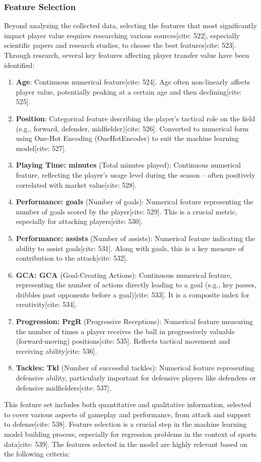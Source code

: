\documentclass[12pt]{report}
\begin{document}
{{{\subsubsection{Feature Selection}
Beyond analyzing the collected data, selecting the features that most significantly impact player value requires researching various sources[cite: 522], especially scientific papers and research studies, to choose the best features[cite: 523]. Through research, several key features affecting player transfer value have been identified:
\begin{enumerate}
    \item \textbf{Age}: Continuous numerical feature[cite: 524]. Age often non-linearly affects player value, potentially peaking at a certain age and then declining[cite: 525].
    \item \textbf{Position}: Categorical feature describing the player's tactical role on the field (e.g., forward, defender, midfielder)[cite: 526]. Converted to numerical form using One-Hot Encoding (OneHotEncoder) to suit the machine learning model[cite: 527].
    \item \textbf{Playing Time: minutes} (Total minutes played): Continuous numerical feature, reflecting the player's usage level during the season – often positively correlated with market value[cite: 528].
    \item \textbf{Performance: goals} (Number of goals): Numerical feature representing the number of goals scored by the player[cite: 529]. This is a crucial metric, especially for attacking players[cite: 530].
    \item \textbf{Performance: assists} (Number of assists): Numerical feature indicating the ability to assist goals[cite: 531]. Along with goals, this is a key measure of contribution to the attack[cite: 532].
    \item \textbf{GCA: GCA} (Goal-Creating Actions): Continuous numerical feature, representing the number of actions directly leading to a goal (e.g., key passes, dribbles past opponents before a goal)[cite: 533]. It is a composite index for creativity[cite: 534].
    \item \textbf{Progression: PrgR} (Progressive Receptions): Numerical feature measuring the number of times a player receives the ball in progressively valuable (forward-moving) positions[cite: 535]. Reflects tactical movement and receiving ability[cite: 536].
    \item \textbf{Tackles: Tkl} (Number of successful tackles): Numerical feature representing defensive ability, particularly important for defensive players like defenders or defensive midfielders[cite: 537].
\end{enumerate}
This feature set includes both quantitative and qualitative information, selected to cover various aspects of gameplay and performance, from attack and support to defense[cite: 538]. Feature selection is a crucial step in the machine learning model building process, especially for regression problems in the context of sports data[cite: 539]. The features selected in the model are highly relevant based on the following criteria:

}}}
\end{document}
